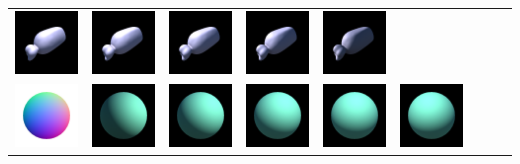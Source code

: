 \begin{center}
\begin{longtable}{@{}c@{}c@{}c@{}c@{}c@{}c@{}c@{}c@{}c@{}}
\includegraphics[width=0.1\linewidth]{training/34_3.png} & \includegraphics[width=0.1\linewidth]{training/34_4.png} &
\includegraphics[width=0.1\linewidth]{training/34_5.png} & \includegraphics[width=0.1\linewidth]{training/34_6.png} &
\includegraphics[width=0.1\linewidth]{training/34_7.png} \\
\includegraphics[width=0.1\linewidth]{training/35_gt.png} & \includegraphics[width=0.1\linewidth]{training/35_0.png} &
\includegraphics[width=0.1\linewidth]{training/35_1.png} & \includegraphics[width=0.1\linewidth]{training/35_2.png} &
\includegraphics[width=0.1\linewidth]{training/35_3.png} & \includegraphics[width=0.1\linewidth]{training/35_4.png} &

\end{longtable}
\end{center}
